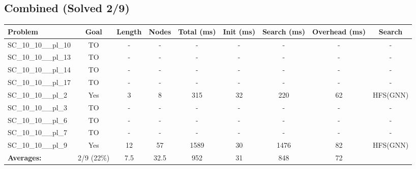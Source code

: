 \documentclass{article}
\begin{document}
\subsection*{Combined (Solved 2/9)}
\begin{tabular}{lcccccccc}
\toprule
Problem & Goal & Length & Nodes & Total (ms) & Init (ms) & Search (ms) & Overhead (ms) & Search \\
\midrule
SC\_10\_10\_\_pl\_10 & TO & - & - & - & - & - & - & - \\
SC\_10\_10\_\_pl\_13 & TO & - & - & - & - & - & - & - \\
SC\_10\_10\_\_pl\_14 & TO & - & - & - & - & - & - & - \\
SC\_10\_10\_\_pl\_17 & TO & - & - & - & - & - & - & - \\
SC\_10\_10\_\_pl\_2 & Yes & 3 & 8 & 315 & 32 & 220 & 62 & HFS(GNN) \\
SC\_10\_10\_\_pl\_3 & TO & - & - & - & - & - & - & - \\
SC\_10\_10\_\_pl\_6 & TO & - & - & - & - & - & - & - \\
SC\_10\_10\_\_pl\_7 & TO & - & - & - & - & - & - & - \\
SC\_10\_10\_\_pl\_9 & Yes & 12 & 57 & 1589 & 30 & 1476 & 82 & HFS(GNN) \\
\textbf{Averages:} & 2/9 (22\%) & 7.5 & 32.5 & 952 & 31 & 848 & 72 & \\
\bottomrule
\end{tabular}
\\[0.7cm]
\end{document}
